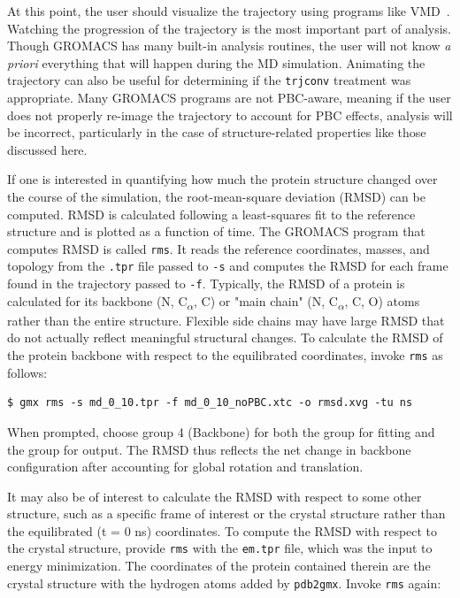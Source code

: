 \documentclass[9pt,tutorial,pubversion]{livecoms}
\begin{document}
At this point, the user should visualize the trajectory using programs like VMD~\cite{Humphrey1996}. Watching the progression of the trajectory is the most important part of analysis. Though GROMACS has many built-in analysis routines, the user will not know {\em a priori} everything that will happen during the MD simulation. Animating the trajectory can also be useful for determining if the \texttt{trjconv} treatment was appropriate. Many GROMACS programs are not PBC-aware, meaning if the user does not properly re-image the trajectory to account for PBC effects, analysis will be incorrect, particularly in the case of structure-related properties like those discussed here.

If one is interested in quantifying how much the protein structure changed over the course of the simulation, the root-mean-square deviation (RMSD) can be computed. RMSD is calculated following a least-squares fit to the reference structure and is plotted as a function of time. The GROMACS program that computes RMSD is called \texttt{rms}. It reads the reference coordinates, masses, and topology from the \texttt{.tpr} file passed to \texttt{-s} and computes the RMSD for each frame found in the trajectory passed to \texttt{-f}. Typically, the RMSD of a protein is calculated for its backbone (N, C\textsubscript{$\alpha$}, C) or "main chain" (N, C\textsubscript{$\alpha$}, C, O) atoms rather than the entire structure. Flexible side chains may have large RMSD that do not actually reflect meaningful structural changes. To calculate the RMSD of the protein backbone with respect to the equilibrated coordinates, invoke \texttt{rms} as follows:

\begin{lstlisting}
$ gmx rms -s md_0_10.tpr -f md_0_10_noPBC.xtc -o rmsd.xvg -tu ns
\end{lstlisting}
%
When prompted, choose group 4 (Backbone) for both the group for fitting and the group for output. The RMSD thus reflects the net change in backbone configuration after accounting for global rotation and translation.

It may also be of interest to calculate the RMSD with respect to some other structure, such as a specific frame of interest or the crystal structure rather than the equilibrated (t = 0 ns) coordinates. To compute the RMSD with respect to the crystal structure, provide \texttt{rms} with the \texttt{em.tpr} file, which was the input to energy minimization. The coordinates of the protein contained therein are the crystal structure with the hydrogen atoms added by \texttt{pdb2gmx}. Invoke \texttt{rms} again:
\end{document}
